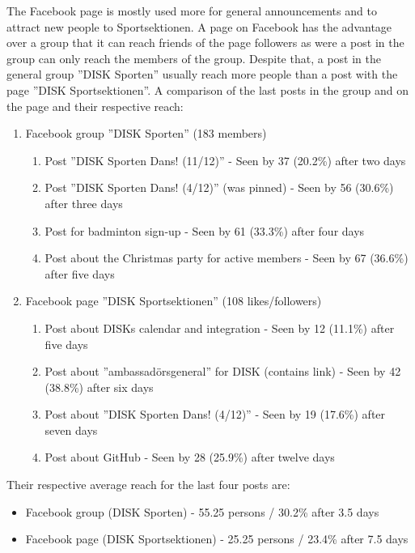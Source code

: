 \documentclass[12pt,a4paper]{article}
\begin{document}
			The Facebook page is mostly used more for general announcements and to attract new people to Sportsektionen. A page on Facebook has the advantage over a group that it can reach friends of the page followers as were a post in the group can only reach the members of the group. Despite that, a post in the general group ''DISK Sporten'' usually reach more people than a post with the page ''DISK Sportsektionen''. A comparison of the last posts in the group and on the page and their respective reach:
			\begin{enumerate}
				\item Facebook group ''DISK Sporten'' (183 members)
				\begin{enumerate}
					\item Post ''DISK Sporten Dans! (11/12)'' - Seen by 37 (20.2\%) after two days
					\item Post ''DISK Sporten Dans! (4/12)'' (was pinned) - Seen by 56 (30.6\%) after three days
					\item Post for badminton sign-up - Seen by 61 (33.3\%) after four days
					\item Post about the Christmas party for active members - Seen by 67 (36.6\%) after five days
				\end{enumerate}
				\item Facebook page ''DISK Sportsektionen'' (108 likes/followers)
				\begin{enumerate}
					\item Post about DISKs calendar and integration - Seen by 12 (11.1\%) after five days
					\item Post about ''ambassadörsgeneral'' for DISK (contains link) -  Seen by 42 (38.8\%) after six days
					\item Post about ''DISK Sporten Dans! (4/12)'' - Seen by 19 (17.6\%) after seven days
					\item Post about GitHub - Seen by 28 (25.9\%) after twelve days
				\end{enumerate}
			\end{enumerate}

			Their respective average reach for the last four posts are:
			\begin{itemize}
				\item{Facebook group (DISK Sporten)} - 55.25 persons / 30.2\% after 3.5 days
				\item{Facebook page (DISK Sportsektionen)} - 25.25 persons / 23.4\% after 7.5 days
			\end{itemize}
\end{document}
